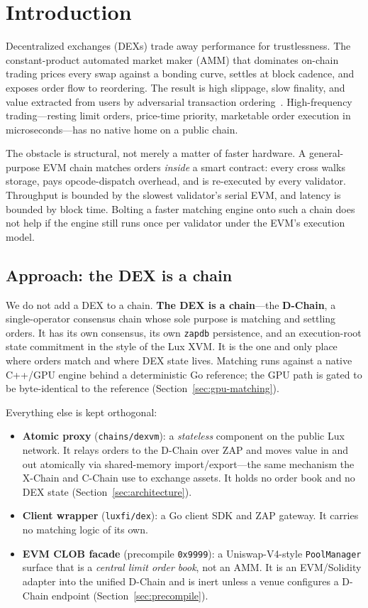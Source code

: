 \section{Introduction}

Decentralized exchanges (DEXs) trade away performance for trustlessness. The
constant-product automated market maker (AMM) that dominates on-chain trading
prices every swap against a bonding curve, settles at block cadence, and exposes
order flow to reordering. The result is high slippage, slow finality, and value
extracted from users by adversarial transaction ordering~\cite{daian2020}.
High-frequency trading---resting limit orders, price-time priority, marketable
order execution in microseconds---has no native home on a public chain.

The obstacle is structural, not merely a matter of faster hardware. A general-purpose
EVM chain matches orders \emph{inside} a smart contract: every cross walks storage,
pays opcode-dispatch overhead, and is re-executed by every validator. Throughput is
bounded by the slowest validator's serial EVM, and latency is bounded by block time.
Bolting a faster matching engine onto such a chain does not help if the engine still
runs once per validator under the EVM's execution model.

\subsection{Approach: the DEX is a chain}

We do not add a DEX to a chain. \textbf{The DEX is a chain}---the \textbf{D-Chain},
a single-operator consensus chain whose sole purpose is matching and settling orders.
It has its own consensus, its own \texttt{zapdb} persistence, and an execution-root
state commitment in the style of the Lux XVM. It is the one and only place where
orders match and where DEX state lives. Matching runs against a native C++/GPU engine
behind a deterministic Go reference; the GPU path is gated to be byte-identical to the
reference (Section~\ref{sec:gpu-matching}).

Everything else is kept orthogonal:

\begin{itemize}
  \item \textbf{Atomic proxy} (\texttt{chains/dexvm}): a \emph{stateless} component
  on the public Lux network. It relays orders to the D-Chain over ZAP and moves
  value in and out atomically via shared-memory import/export---the same mechanism
  the X-Chain and C-Chain use to exchange assets. It holds no order book and no DEX
  state (Section~\ref{sec:architecture}).
  \item \textbf{Client wrapper} (\texttt{luxfi/dex}): a Go client SDK and ZAP
  gateway. It carries no matching logic of its own.
  \item \textbf{EVM CLOB facade} (precompile \texttt{0x9999}): a Uniswap-V4-style
  \texttt{PoolManager} surface that is a \emph{central limit order book}, not an AMM.
  It is an EVM/Solidity adapter into the unified D-Chain and is inert unless a venue
  configures a D-Chain endpoint (Section~\ref{sec:precompile}).
\end{itemize}

